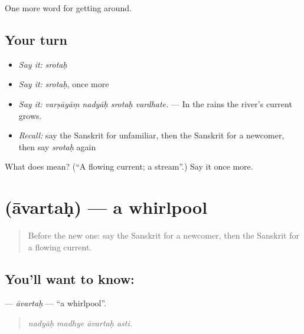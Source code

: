 \begin{grammarlens}[title={What you've built}]
One more word for getting around.
\end{grammarlens}

\subsection*{Your turn}
\begin{itemize}
\raggedright
  \item \emph{Say it:} \emph{srotaḥ}
  \item \emph{Say it:} \emph{srotaḥ}, once more
  \item \emph{Say it:} \emph{varṣāyāṃ nadyāḥ srotaḥ vardhate.} — In the rains the river's current grows.
  \item \emph{Recall:} say the Sanskrit for unfamiliar, then the Sanskrit for a newcomer, then say \emph{srotaḥ} again
\end{itemize}

\begin{tcolorbox}[breakable,colback=teal!4,colframe=teal!35!black,title={Before you move on}]
What does  mean? (\textquotedblleft{}A flowing current; a stream\textquotedblright{}.) Say it once more.
\end{tcolorbox}
\section[\texorpdfstring{\sk{आवर्तः} (āvartaḥ)}{आवर्तः (āvartaḥ)}]{ (āvartaḥ) — a whirlpool}

\label{lesson:SA-C415-avartah}



\begin{quote}
Before the new one: say the Sanskrit for a newcomer, then the Sanskrit for a flowing current.
\end{quote}

\subsection*{You'll want to know: }
\textbf{} — \emph{āvartaḥ} — \textquotedblleft{}a whirlpool\textquotedblright{}.

\begin{quote}
   
\end{quote}

\begin{quote}
\emph{nadyāḥ madhye āvartaḥ asti.}
\end{quote}

